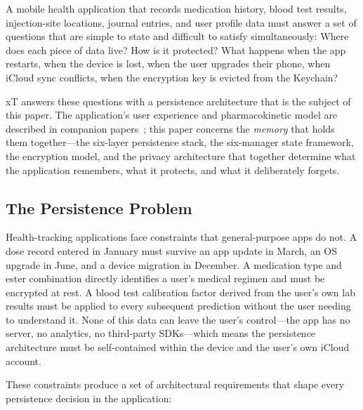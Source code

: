 \documentclass[11pt,a4paper]{article}
\begin{document}
A mobile health application that records medication history, blood test
results, injection-site locations, journal entries, and user profile data
must answer a set of questions that are simple to state and difficult to
satisfy simultaneously: Where does each piece of data live? How is it
protected? What happens when the app restarts, when the device is lost, when
the user upgrades their phone, when iCloud sync conflicts, when the
encryption key is evicted from the Keychain?

xT answers these questions with a persistence architecture that is the
subject of this paper. The application's user experience and pharmacokinetic
model are described in companion papers~\cite{xtux,xtpk}; this paper concerns
the \emph{memory} that holds them together---the six-layer persistence stack,
the six-manager state framework, the encryption model, and the privacy
architecture that together determine what the application remembers, what it
protects, and what it deliberately forgets.

\subsection{The Persistence Problem}
\label{sec:persistence_problem}

Health-tracking applications face constraints that general-purpose apps do
not. A dose record entered in January must survive an app update in March,
an OS upgrade in June, and a device migration in December. A medication type
and ester combination directly identifies a user's medical regimen and must
be encrypted at rest. A blood test calibration factor derived from the user's
own lab results must be applied to every subsequent prediction without the
user needing to understand it. None of this data can leave the user's
control---the app has no server, no analytics, no third-party SDKs---which
means the persistence architecture must be self-contained within the device
and the user's own iCloud account.

These constraints produce a set of architectural requirements that shape
every persistence decision in the application:
\end{document}
